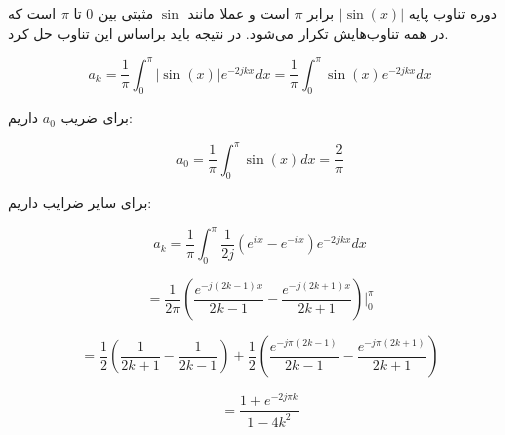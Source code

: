 \documentclass[12pt]{article}
\begin{document}
دوره تناوب پایه $|\sin (x)|$ برابر $\pi$ است و عملا مانند $\sin$ مثبتی بین $0$ تا $\pi$ است که در همه تناوب‌هایش تکرار می‌شود. در نتیجه باید براساس این تناوب حل کرد.

$$a_k = \frac{1}{\pi} \int_{0}^{\pi} |\sin (x)| e^{- 2 j k x} dx = \frac{1}{\pi}\int_{0}^{\pi} \sin (x) e^{- 2 j k x} dx $$

برای ضریب $a_0$ داریم:

$$a_0 = \frac{1}{\pi} \int_{0}^{\pi} \sin (x) dx = \frac{2}{\pi}$$


برای سایر ضرایب داریم:

$$a_k = \frac{1}{\pi}\int_{0}^{\pi} \frac{1}{2 j} (e^{i x} - e^{-ix}) e^{- 2 j k x}  dx$$

$$=\frac{1}{2 \pi} \left(\frac{e^{-j (2 k-1) x}}{2 k-1}-\frac{e^{-j (2 k+1) x}}{2 k+1}\right)|_{0}^{\pi}$$

$$=\frac{1}{2} \left(\frac{1}{2 k+1}-\frac{1}{2 k-1}\right)+\frac{1}{2} \left(\frac{e^{-j \pi  (2 k-1)}}{2 k-1}-\frac{e^{-j \pi  (2 k+1)}}{2 k+1}\right)$$

$$=\boxed{\frac{1+e^{-2 j \pi  k}}{1-4 k^2}}$$
\end{document}

